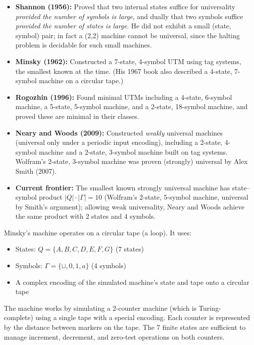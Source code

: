 \begin{itemize}
\item \textbf{Shannon (1956):} Proved that two internal states suffice for universality \emph{provided the number of symbols is large}, and dually that two symbols suffice \emph{provided the number of states is large}. He did not exhibit a small (state, symbol) pair; in fact a (2,2) machine cannot be universal, since the halting problem is decidable for such small machines.
\item \textbf{Minsky (1962):} Constructed a 7-state, 4-symbol UTM using tag systems, the smallest known at the time. (His 1967 book also described a 4-state, 7-symbol machine on a circular tape.)
\item \textbf{Rogozhin (1996):} Found minimal UTMs including a 4-state, 6-symbol machine, a 5-state, 5-symbol machine, and a 2-state, 18-symbol machine, and proved these are minimal in their classes.
\item \textbf{Neary and Woods (2009):} Constructed \emph{weakly} universal machines (universal only under a periodic input encoding), including a 2-state, 4-symbol machine and a 2-state, 3-symbol machine built on tag systems. Wolfram's 2-state, 3-symbol machine was proven (strongly) universal by Alex Smith (2007).
\item \textbf{Current frontier:} The smallest known strongly universal machine has state--symbol product $|Q| \cdot |\Gamma| = 10$ (Wolfram's 2-state, 5-symbol machine, universal by Smith's argument); allowing weak universality, Neary and Woods achieve the same product with 2 states and 4 symbols.
\end{itemize}

\begin{example}
Minsky's machine operates on a circular tape (a loop). It uses:
\begin{itemize}
\item States: $Q = \{A, B, C, D, E, F, G\}$ (7 states)
\item Symbols: $\Gamma = \{\sqcup, 0, 1, a\}$ (4 symbols)
\item A complex encoding of the simulated machine's state and tape onto a circular tape
\end{itemize}
The machine works by simulating a 2-counter machine (which is Turing-complete) using a single tape with a special encoding. Each counter is represented by the distance between markers on the tape. The 7 finite states are sufficient to manage increment, decrement, and zero-test operations on both counters.
\end{example}

